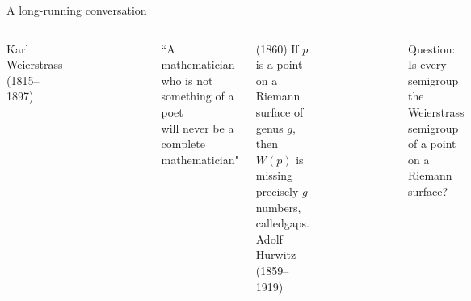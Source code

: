 \documentclass[12pt, aspectratio=169]{beamer}
\begin{document}
 \begin{frame}{A long-running conversation}
 
\begin{columns}
\alert{Karl Weierstrass} (1815--1897)
\begin{figure}
    \flushleft
    \includegraphics[width=.3\textwidth]{"KarlWeierstrassSmall.pdf"}
\end{figure}
  
\begin{small}
 ``A mathematician who is not something of a poet\\ will never be a complete mathematician" 
\end{small}
 \smallskip
 
(1860) If $p$ is a point on a Riemann surface of genus $g$,
 then $W(p)$ is missing precisely $g$ numbers, called\alert{gaps}. 
\alert{Adolf Hurwitz} (1859--1919)
\begin{figure}
    \flushleft
    \includegraphics[width=.4\textwidth]{"Adolf_Hurwitz.jpg"}
\end{figure}
\begin{small}
 \begin{block}{Question:}
Is every semigroup the Weierstrass semigroup of a point
on a Riemann surface?
\end{block}
 \end{small}
\end{columns}

\end{frame}
\end{document}
